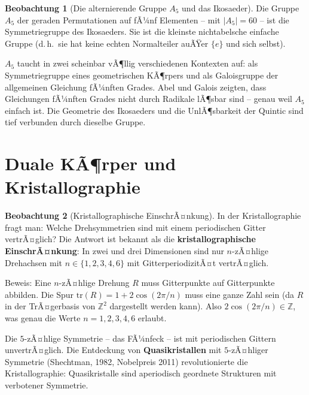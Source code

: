 ﻿\documentclass[a4paper,12pt]{report}
\theoremstyle{definition}
\newtheorem{beobachtung}{Beobachtung}
\begin{document}
\begin{beobachtung}[Die alternierende Gruppe $A_5$ und das Ikosaeder]
    Die Gruppe $A_5$ der geraden Permutationen auf fÃ¼nf Elementen --
    mit $|A_5| = 60$ -- ist die Symmetriegruppe des Ikosaeders.
    Sie ist die kleinste nichtabelsche einfache Gruppe (d.\,h.\ sie hat
    keine echten Normalteiler auÃŸer $\{e\}$ und sich selbst).

    $A_5$ taucht in zwei scheinbar vÃ¶llig verschiedenen Kontexten auf:
    als Symmetriegruppe eines geometrischen KÃ¶rpers und als Galoisgruppe
    der allgemeinen Gleichung fÃ¼nften Grades. Abel und Galois zeigten,
    dass Gleichungen fÃ¼nften Grades nicht durch Radikale lÃ¶sbar sind --
    genau weil $A_5$ einfach ist. Die Geometrie des Ikosaeders und die
    UnlÃ¶sbarkeit der Quintic sind tief verbunden durch dieselbe Gruppe.
\end{beobachtung}


\section{Duale KÃ¶rper und Kristallographie}

\begin{beobachtung}[Kristallographische EinschrÃ¤nkung]
    In der Kristallographie fragt man: Welche Drehsymmetrien sind mit
    einem periodischen Gitter vertrÃ¤glich? Die Antwort ist bekannt
    als die \textbf{kristallographische EinschrÃ¤nkung}: In zwei und
    drei Dimensionen sind nur $n$-zÃ¤hlige Drehachsen mit $n \in \{1,2,3,4,6\}$
    mit GitterperiodizitÃ¤t vertrÃ¤glich.

    Beweis: Eine $n$-zÃ¤hlige Drehung $R$ muss Gitterpunkte auf
    Gitterpunkte abbilden. Die Spur $\mathrm{tr}(R) = 1 + 2\cos(2\pi/n)$
    muss eine ganze Zahl sein (da $R$ in der TrÃ¤gerbasis von $\mathbb{Z}^2$
    dargestellt werden kann). Also $2\cos(2\pi/n) \in \mathbb{Z}$,
    was genau die Werte $n = 1, 2, 3, 4, 6$ erlaubt.

    Die $5$-zÃ¤hlige Symmetrie -- das FÃ¼nfeck -- ist mit periodischen
    Gittern unvertrÃ¤glich. Die Entdeckung von \textbf{Quasikristallen}
    mit $5$-zÃ¤hliger Symmetrie (Shechtman, 1982, Nobelpreis 2011)
    revolutionierte die Kristallographie: Quasikristalle sind
    aperiodisch geordnete Strukturen mit verbotener Symmetrie.
\end{beobachtung}
\end{document}
